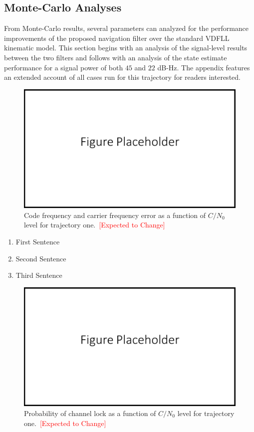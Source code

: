 \clearpage
\subsection{\textbf{Monte-Carlo Analyses}}
From Monte-Carlo results, several parameters can analyzed for the performance improvements of the proposed navigation filter over the standard VDFLL kinematic model. This section begins with an analysis of the signal-level results between the two filters and follows with an analysis of the state estimate performance for a signal power of both \(45\) and \(22\) dB-Hz. The appendix features an extended account of all cases run for this trajectory for readers interested.
\begin{figure}[!ht]
    \centering
    \includegraphics[width=0.5\linewidth]{Figures/FigurePlaceholder.png}
    \caption{Code frequency and carrier frequency error as a function of \(C/N_0\) level for trajectory one.~\textcolor{red}{[Expected to Change]}}\label{fig:truecodefreqerrror2}
\end{figure}

\begin{enumerate}
    \item First Sentence
    \item Second Sentence
    \item Third Sentence
\end{enumerate}

\begin{figure}[!ht]
    \centering
    \includegraphics[width=0.5\linewidth]{Figures/FigurePlaceholder.png}
    \caption{Probability of channel lock as a function of \(C/N_0\) level for trajectory one.~\textcolor{red}{[Expected to Change]}}\label{fig:trackingprobability2}
\end{figure}


